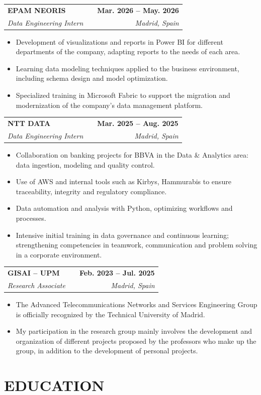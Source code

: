\documentclass[a4paper,10pt]{article}
\makeatletter
\newcommand{\smallblacksquare}{\raisebox{0.4ex}{\rule{0.6ex}{0.6ex}}}
\newenvironment{joblong}[4]
{
	\begin{tabularx}{\linewidth}{@{}l X r@{}}
		\textbf{#1} & \hfill & \textbf{#2} \\
		\small\textit{#3} & \hfill & \small\textit{#4} \\[3.75pt]
	\end{tabularx}
	\begin{minipage}[t]{\linewidth}
		\begin{itemize}[nosep,after=\strut, leftmargin=1em, itemsep=3pt,label=\smallblacksquare]
		}
		{
		\end{itemize}
	\end{minipage}    
}
\makeatother
\begin{document}
	\begin{joblong}{EPAM NEORIS}{Mar. 2026 – May. 2026}{Data Engineering Intern}{Madrid, Spain}
		\item Development of visualizations and reports in Power BI for different departments of the company, adapting reports to the needs of each area.
		\item Learning data modeling techniques applied to the business environment, including schema design and model optimization.
		\item Specialized training in Microsoft Fabric to support the migration and modernization of the company's data management platform.
	\end{joblong}
	
	\begin{joblong}{NTT DATA}{Mar. 2025 – Aug. 2025}{Data Engineering Intern}{Madrid, Spain}
		\item Collaboration on banking projects for BBVA in the Data \& Analytics area: data ingestion, modeling and quality control.
		\item Use of AWS and internal tools such as Kirbys, Hammurabis to ensure traceability, integrity and regulatory compliance.
		\item Data automation and analysis with Python, optimizing workflows and processes.
		\item Intensive initial training in data governance and continuous learning; strengthening competencies in teamwork, communication and problem solving in a corporate environment.
	\end{joblong}
	
	\begin{joblong}{GISAI – UPM}{Feb. 2023 – Jul. 2025}{Research Associate}{Madrid, Spain}
		\item The Advanced Telecommunications Networks and Services Engineering Group is officially recognized by the Technical University of Madrid.
		\item My participation in the research group mainly involves the development and organization of different projects proposed by the professors who make up the group, in addition to the development of personal projects.
	\end{joblong}
	
	\section{EDUCATION}
	
\end{document}
